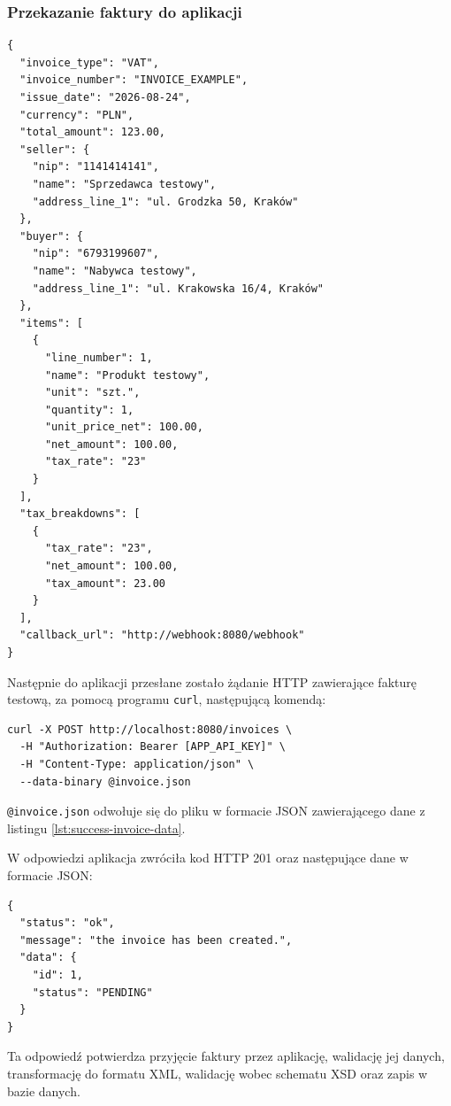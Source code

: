 \subsubsection{Przekazanie faktury do aplikacji}

\begin{lstlisting}[style=thesiscode, caption={Dane faktury zawierającej uprawniony NIP sprzedawcy}, label={lst:success-invoice-data}]
{
  "invoice_type": "VAT",
  "invoice_number": "INVOICE_EXAMPLE",
  "issue_date": "2026-08-24",
  "currency": "PLN",
  "total_amount": 123.00,
  "seller": {
    "nip": "1141414141",
    "name": "Sprzedawca testowy",
    "address_line_1": "ul. Grodzka 50, Kraków"
  },
  "buyer": {
    "nip": "6793199607",
    "name": "Nabywca testowy",
    "address_line_1": "ul. Krakowska 16/4, Kraków"
  },
  "items": [
    {
      "line_number": 1,
      "name": "Produkt testowy",
      "unit": "szt.",
      "quantity": 1,
      "unit_price_net": 100.00,
      "net_amount": 100.00,
      "tax_rate": "23"
    }
  ],
  "tax_breakdowns": [
    {
      "tax_rate": "23",
      "net_amount": 100.00,
      "tax_amount": 23.00
    }
  ],
  "callback_url": "http://webhook:8080/webhook"
}
\end{lstlisting}

Następnie do aplikacji przesłane zostało żądanie HTTP zawierające fakturę testową, za pomocą programu \texttt{curl}, następującą komendą:

\begin{lstlisting}[style=thesiscode, caption={Przekazanie faktury do aplikacji}, label={lst:scenario-submit-invoice}]
curl -X POST http://localhost:8080/invoices \
  -H "Authorization: Bearer [APP_API_KEY]" \
  -H "Content-Type: application/json" \
  --data-binary @invoice.json
\end{lstlisting}

\texttt{@invoice.json} odwołuje się do pliku w formacie JSON zawierającego dane z listingu \ref{lst:success-invoice-data}.

W odpowiedzi aplikacja zwróciła kod HTTP 201 oraz następujące dane w formacie JSON:

\begin{lstlisting}[style=thesiscode, caption={Odpowiedź aplikacji po przyjęciu faktury}, label={lst:scenario-create-response}]
{
  "status": "ok",
  "message": "the invoice has been created.",
  "data": {
    "id": 1,
    "status": "PENDING"
  }
}
\end{lstlisting}

Ta odpowiedź potwierdza przyjęcie faktury przez aplikację, walidację jej danych, transformację do formatu XML, walidację wobec schematu XSD oraz zapis w bazie danych.

